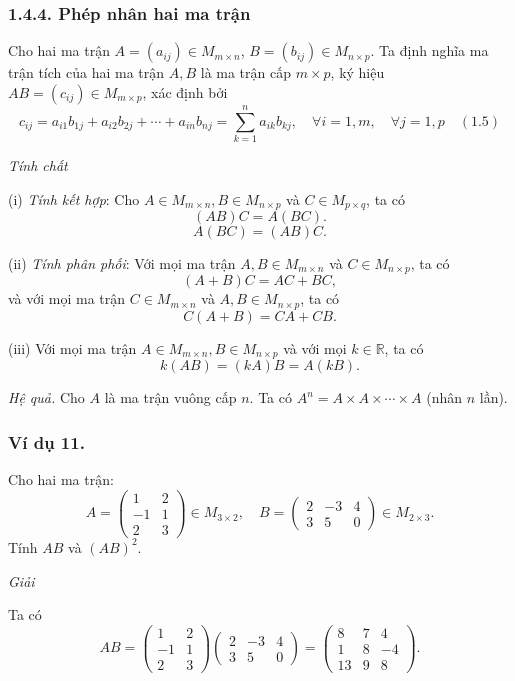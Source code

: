 \subsubsection*{1.4.4. Phép nhân hai ma trận}
Cho hai ma trận \( A = (a_{ij}) \in M_{m \times n} \), \( B = (b_{ij}) \in M_{n \times p} \). Ta định nghĩa ma trận tích của hai ma trận \( A, B \) là ma trận cấp \( m \times p \), ký hiệu \( AB = (c_{ij}) \in M_{m \times p} \), xác định bởi
\[
c_{ij} = a_{i1}b_{1j} + a_{i2}b_{2j} + \cdots + a_{in}b_{nj} = \sum_{k=1}^n a_{ik}b_{kj}, \quad \forall i = 1, m, \quad \forall j = 1, p \quad (1.5)
\]

\textit{Tính chất}

(i) \textit{Tính kết hợp}: Cho \( A \in M_{m \times n}, B \in M_{n \times p} \) và \( C \in M_{p \times q} \), ta có
\[
(AB)C = A(BC).
\]
\[ A(BC) = (AB)C. \]

(ii) \textit{Tính phân phối}: Với mọi ma trận \( A, B \in M_{m \times n} \) và \( C \in M_{n \times p} \), ta có
\[
(A + B)C = AC + BC,
\]
và với mọi ma trận \( C \in M_{m \times n} \) và \( A, B \in M_{n \times p} \), ta có
\[
C(A + B) = CA + CB.
\]

(iii) Với mọi ma trận \( A \in M_{m \times n}, B \in M_{n \times p} \) và với mọi \( k \in \mathbb{R} \), ta có
\[
k(AB) = (kA)B = A(kB).
\]

\textit{Hệ quả.} Cho \( A \) là ma trận vuông cấp \( n \). Ta có \( A^n = A \times A \times \cdots \times A \) (nhân \( n \) lần).

\subsubsection*{Ví dụ 11.}
Cho hai ma trận:
\[
A = \begin{pmatrix}
1 & 2 \\
-1 & 1 \\
2 & 3
\end{pmatrix} \in M_{3 \times 2}
, \quad
B = \begin{pmatrix}
2 & -3 & 4 \\
3 & 5 & 0
\end{pmatrix} \in M_{2 \times 3}
.
\]
Tính \( AB \) và \( (AB)^2 \).

\textit{Giải}

Ta có
\[
AB = \begin{pmatrix}
1 & 2 \\
-1 & 1 \\
2 & 3
\end{pmatrix}
\begin{pmatrix}
2 & -3 & 4 \\
3 & 5 & 0
\end{pmatrix}
= \begin{pmatrix}
8 & 7 & 4 \\
1 & 8 & -4 \\
13 & 9 & 8
\end{pmatrix}
.
\]

